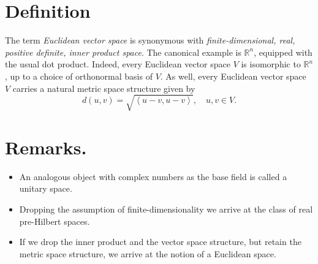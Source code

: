 \documentclass[12pt]{article}
\newcommand{\reals}{\mathbb{R}}
\begin{document}
\section{Definition}
The term \emph{Euclidean vector space} is synonymous with \emph{finite-dimensional, real, positive definite, inner product space}.  The canonical example is $\reals^n$, equipped with the usual dot product.  Indeed, every Euclidean vector space $V$  is isomorphic to $\reals^n$, up to a choice of orthonormal basis of $V$.    As well, every  Euclidean vector space $V$ carries a natural metric space structure given by
$$ d(u,v) = \sqrt{\left< u-v, u-v \right>},\quad u,v\in V.$$

\section{Remarks.}
\begin{itemize}
\item An analogous object with complex numbers as the base field is called a unitary space.
\item Dropping the assumption of finite-dimensionality we arrive at the class of  real pre-Hilbert spaces.
\item  If we drop the inner product and the vector space structure, but retain the metric space structure, we arrive at the notion of a Euclidean space.
\end{itemize}
\end{document}
